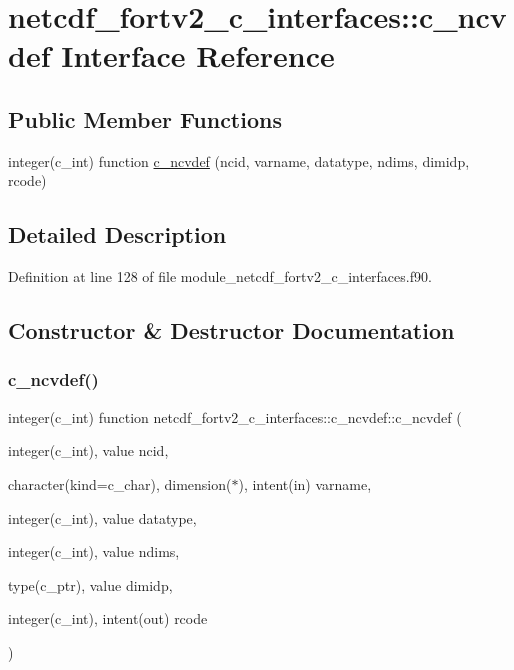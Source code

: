 \hypertarget{interfacenetcdf__fortv2__c__interfaces_1_1c__ncvdef}{}\section{netcdf\+\_\+fortv2\+\_\+c\+\_\+interfaces\+:\+:c\+\_\+ncvdef Interface Reference}
\label{interfacenetcdf__fortv2__c__interfaces_1_1c__ncvdef}
\subsection*{Public Member Functions}
\begin{DoxyCompactItemize}
\item 
integer(c\+\_\+int) function \hyperlink{interfacenetcdf__fortv2__c__interfaces_1_1c__ncvdef_a10fe2538b983554369865c9d7a537dc0}{c\+\_\+ncvdef} (ncid, varname, datatype, ndims, dimidp, rcode)
\end{DoxyCompactItemize}


\subsection{Detailed Description}


Definition at line 128 of file module\+\_\+netcdf\+\_\+fortv2\+\_\+c\+\_\+interfaces.\+f90.



\subsection{Constructor \& Destructor Documentation}
\mbox{\label{interfacenetcdf__fortv2__c__interfaces_1_1c__ncvdef_a10fe2538b983554369865c9d7a537dc0}} 
\subsubsection{\texorpdfstring{c\+\_\+ncvdef()}{c\_ncvdef()}}
{\footnotesize\ttfamily integer(c\+\_\+int) function netcdf\+\_\+fortv2\+\_\+c\+\_\+interfaces\+::c\+\_\+ncvdef\+::c\+\_\+ncvdef (\begin{DoxyParamCaption}\item[{integer(c\+\_\+int), value}]{ncid,  }\item[{character(kind=c\+\_\+char), dimension($\ast$), intent(in)}]{varname,  }\item[{integer(c\+\_\+int), value}]{datatype,  }\item[{integer(c\+\_\+int), value}]{ndims,  }\item[{type(c\+\_\+ptr), value}]{dimidp,  }\item[{integer(c\+\_\+int), intent(out)}]{rcode }\end{DoxyParamCaption})}




